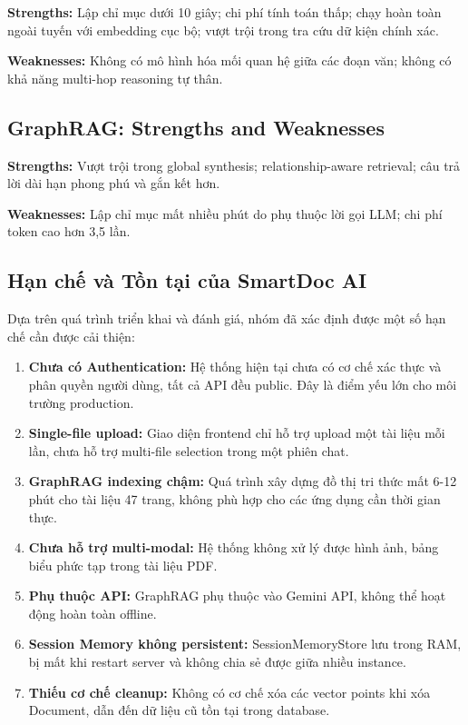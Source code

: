 \documentclass[10pt, conference, a4paper]{IEEEtran}
\begin{document}
\textbf{Strengths:} Lập chỉ mục dưới 10 giây; chi phí tính toán thấp;
chạy hoàn toàn ngoài tuyến với embedding cục bộ; vượt trội trong tra
cứu dữ kiện chính xác.

\textbf{Weaknesses:} Không có mô hình hóa mối quan hệ giữa các đoạn
văn; không có khả năng multi-hop reasoning tự thân.

\subsection{GraphRAG: Strengths and Weaknesses}

\textbf{Strengths:} Vượt trội trong global synthesis; relationship-aware
retrieval; câu trả lời dài hạn phong phú và gắn kết hơn.

\textbf{Weaknesses:} Lập chỉ mục mất nhiều phút do phụ thuộc lời gọi
LLM; chi phí token cao hơn 3,5 lần.

\subsection{Hạn chế và Tồn tại của SmartDoc AI}

Dựa trên quá trình triển khai và đánh giá, nhóm đã xác định được một
số hạn chế cần được cải thiện:

\begin{enumerate}
  \item \textbf{Chưa có Authentication:} Hệ thống hiện tại chưa có
    cơ chế xác thực và phân quyền người dùng, tất cả API đều public.
    Đây là điểm yếu lớn cho môi trường production.
  
  \item \textbf{Single-file upload:} Giao diện frontend chỉ hỗ trợ
    upload một tài liệu mỗi lần, chưa hỗ trợ multi-file selection
    trong một phiên chat.
  
  \item \textbf{GraphRAG indexing chậm:} Quá trình xây dựng đồ thị
    tri thức mất 6-12 phút cho tài liệu 47 trang, không phù hợp cho
    các ứng dụng cần thời gian thực.
  
  \item \textbf{Chưa hỗ trợ multi-modal:} Hệ thống không xử lý được
    hình ảnh, bảng biểu phức tạp trong tài liệu PDF.
  
  \item \textbf{Phụ thuộc API:} GraphRAG phụ thuộc vào Gemini API,
    không thể hoạt động hoàn toàn offline.
  
  \item \textbf{Session Memory không persistent:} SessionMemoryStore
    lưu trong RAM, bị mất khi restart server và không chia sẻ được
    giữa nhiều instance.
  
  \item \textbf{Thiếu cơ chế cleanup:} Không có cơ chế xóa các vector
    points khi xóa Document, dẫn đến dữ liệu cũ tồn tại trong database.
\end{enumerate}
\end{document}
